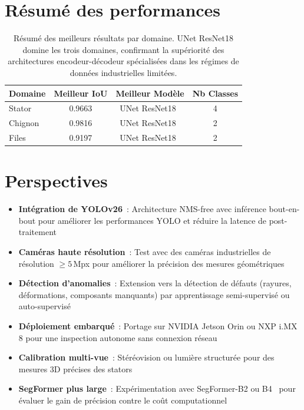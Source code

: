 \documentclass[12pt,a4paper]{report}
\begin{document}
\section{R\'esum\'e des performances}

\begin{table}[H]
\centering
\begin{tabular}{lccc}
\toprule
\textbf{Domaine} & \textbf{Meilleur IoU} & \textbf{Meilleur Mod\`ele} & \textbf{Nb Classes} \\
\midrule
Stator   & 0.9663 & UNet ResNet18~\cite{ronneberger2015unet,he2016resnet}    & 4 \\
Chignon  & 0.9816 & UNet ResNet18~\cite{ronneberger2015unet,he2016resnet}    & 2 \\
Files    & 0.9197 & UNet ResNet18~\cite{ronneberger2015unet,he2016resnet}    & 2 \\
\bottomrule
\end{tabular}
\caption{R\'esum\'e des meilleurs r\'esultats par domaine. UNet ResNet18 domine les trois domaines, confirmant la sup\'eriorit\'e des architectures encodeur-d\'ecodeur sp\'ecialis\'ees dans les r\'egimes de donn\'ees industrielles limit\'ees.}
\end{table}

\section{Perspectives}

\begin{itemize}
    \item \textbf{Int\'egration de YOLOv26}~: Architecture NMS-free avec inf\'erence bout-en-bout pour am\'eliorer les performances YOLO et r\'eduire la latence de post-traitement
    \item \textbf{Cam\'eras haute r\'esolution}~: Test avec des cam\'eras industrielles de r\'esolution $\geq 5$\,Mpx pour am\'eliorer la pr\'ecision des mesures g\'eom\'etriques
    \item \textbf{D\'etection d'anomalies}~: Extension vers la d\'etection de d\'efauts (rayures, d\'eformations, composants manquants) par apprentissage semi-supervis\'e ou auto-supervis\'e
    \item \textbf{D\'eploiement embarqu\'e}~: Portage sur NVIDIA Jetson Orin ou NXP i.MX 8 pour une inspection autonome sans connexion r\'eseau
    \item \textbf{Calibration multi-vue}~: St\'er\'eovision ou lumi\`ere structur\'ee pour des mesures 3D pr\'ecises des stators
    \item \textbf{SegFormer plus large}~: Exp\'erimentation avec SegFormer-B2 ou B4~\cite{xie2021segformer} pour \'evaluer le gain de pr\'ecision contre le co\^ut computationnel
\end{itemize}
\end{document}
